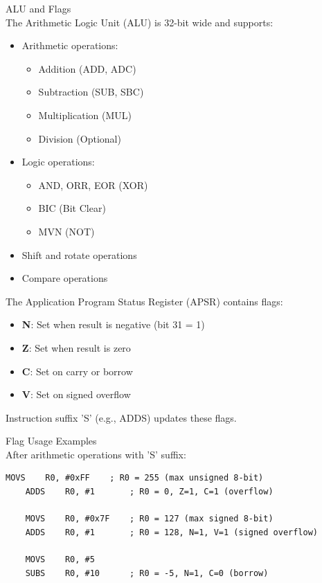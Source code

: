 \begin{definition}{ALU and Flags}\\
The Arithmetic Logic Unit (ALU) is 32-bit wide and supports:
\begin{itemize}
  \item Arithmetic operations:
    \begin{itemize}
      \item Addition (ADD, ADC)
      \item Subtraction (SUB, SBC)
      \item Multiplication (MUL)
      \item Division (Optional)
    \end{itemize}
  \item Logic operations:
    \begin{itemize}
      \item AND, ORR, EOR (XOR)
      \item BIC (Bit Clear)
      \item MVN (NOT)
    \end{itemize}
  \item Shift and rotate operations
  \item Compare operations
\end{itemize}

The Application Program Status Register (APSR) contains flags:
\begin{itemize}
  \item \textbf{N}: Set when result is negative (bit 31 = 1)
  \item \textbf{Z}: Set when result is zero
  \item \textbf{C}: Set on carry or borrow
  \item \textbf{V}: Set on signed overflow
\end{itemize}

Instruction suffix 'S' (e.g., ADDS) updates these flags.
\end{definition}

\begin{example2}{Flag Usage Examples}\\
After arithmetic operations with 'S' suffix:
\begin{lstlisting}[language=armasm, style=base]
    MOVS    R0, #0xFF    ; R0 = 255 (max unsigned 8-bit)
    ADDS    R0, #1       ; R0 = 0, Z=1, C=1 (overflow)
    
    MOVS    R0, #0x7F    ; R0 = 127 (max signed 8-bit)
    ADDS    R0, #1       ; R0 = 128, N=1, V=1 (signed overflow)
    
    MOVS    R0, #5
    SUBS    R0, #10      ; R0 = -5, N=1, C=0 (borrow)
\end{lstlisting}
\end{example2}